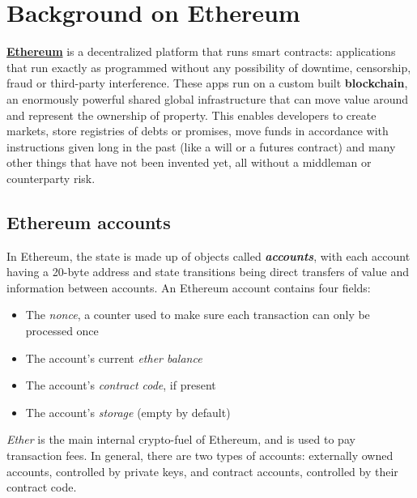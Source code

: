 \label{Chapter2}

\chapter{Background on Ethereum}

\href{https://www.ethereum.org}{\textbf{Ethereum}} is a decentralized platform that runs smart contracts: applications that run exactly as programmed without any possibility of downtime, censorship, fraud or third-party interference.
These apps run on a custom built \textbf{blockchain}, an enormously powerful shared global infrastructure that can move value around and represent the ownership of property.
This enables developers to create markets, store registries of debts or promises, move funds in accordance with instructions given long in the past (like a will or a futures contract) and many other things that have not been invented yet, all without a middleman or counterparty risk.

\section{Ethereum accounts}
In Ethereum, the state is made up of objects called \textbf{\textit{accounts}}, with each account having a 20-byte address and state transitions being direct transfers of value and information between accounts. An Ethereum account contains four fields:
\begin{itemize}
    \item The \textit{nonce}, a counter used to make sure each transaction can only be processed once
    \item The account's current \textit{ether balance}
    \item The account's \textit{contract code}, if present
    \item The account's \textit{storage} (empty by default)
\end{itemize}
\textit{Ether} is the main internal crypto-fuel of Ethereum, and is used to pay transaction fees. \newline In general, there are two types of accounts: externally owned accounts, controlled by private keys, and contract accounts, controlled by their contract code.


